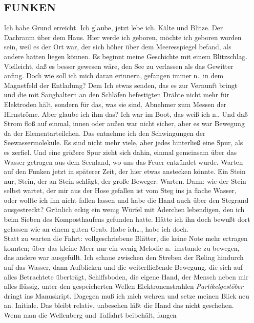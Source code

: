 \documentclass[
]{article}
\author{}
\date{\vspace{-2.5em}}
\begin{document}
\subsection{FUNKEN}\label{funken}

Ich habe Grund erreicht. Ich glaube, jetzt lebe ich. Kälte und Blitze.
Der Dachraum über dem Haus. Hier werde ich geboren, möchte ich geboren
worden sein, weil es der Ort war, der sich höher über dem Meeresspiegel
befand, als andere hätten liegen können. Es beginnt meine Geschichte mit
einem Blitzschlag. Vielleicht, daß es besser gewesen wäre, den See zu
verlassen als das Gewitter anfing. Doch wie soll ich mich daran
erinnern, gefangen immer n.~in dem Magnetfeld der Entladung? Dem Ich
etwas senden, das es zur Vernunft bringt und die mit Saughaltern an den
Schläfen befestigten Drähte nicht mehr für Elektroden hält, sondern für
das, was sie sind, Abnehmer zum Messen der Hirnströme. Aber glaube ich
ihm das? Ich war im Boot, das weiß ich n.. Und daß Strom floß auf
einmal, innen oder außen war nicht sicher, aber es war Bewegung da der
Elementarteilchen. Das entnehme ich den Schwingungen der
Seewassermoleküle. Es sind nicht mehr viele, aber jedes hinterließ eine
Spur, als es zerfiel. Und eine größere Spur zieht sich dahin, einmal
gemeinsam über das Wasser getragen aus dem Seenland, wo uns das Feuer
entzündet wurde. Warten auf den Funken jetzt in späterer Zeit, der hier
etwas anstecken könnte. Ein Stein nur, Stein, der an Stein schlägt, der
große Beweger. Warten. Dann: wie der Stein selbst wartet, der mir aus
der Hose gefallen ist vom Steg ins ja flache Wasser, oder wollte ich ihn
nicht fallen lassen und habe die Hand auch über den Stegrand
ausgestreckt? Grünlich eckig ein wenig Würfel mit Äderchen lebendigen,
den ich beim Sieben des Komposthaufens gefunden hatte. Hätte ich ihn
doch bewußt dort gelassen wie an einem guten Grab. Habe ich\ldots, habe
ich doch.\\
Statt zu warten die Fahrt: vollgeschriebene Blätter, die keine Note mehr
ertragen konnten; über das kleine Meer nur ein wenig Melodie n.~imstande
zu bewegen, das andere war ausgefüllt. Ich schaue zwischen den Streben
der Reling hindurch auf das Wasser, dann Aufblicken und die
weiterfließende Bewegung, die sich auf alles Betrachtete überträgt,
Schiffsboden, die eigene Hand, der Mensch neben mir alles flüssig, unter
den gespeicherten Wellen Elektronenstrahlen \emph{Partikelgestöber
}dringt ins Manuskript. Dagegen muß ich mich wehren und setze meinen
Blick neu an. Initiale. Das bleibt relativ, unbesehen läßt die Hand das
nicht geschehen. Wenn man die Wellenberg und Talfahrt beibehält, fangen
\end{document}
